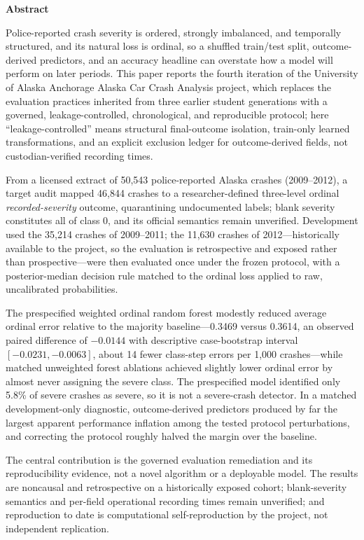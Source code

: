 \documentclass[11pt,letterpaper]{article}
\newcommand{\frontheading}[1]{%
  \begin{center}\bfseries #1\end{center}\vspace{8pt}%
}
\newcommand{\projectname}{Alaska Car Crash Analysis}
\begin{document}
\clearpage
\frontheading{Abstract}
Police-reported crash severity is ordered, strongly imbalanced, and temporally structured, and its natural loss is ordinal, so a shuffled train/test split, outcome-derived predictors, and an accuracy headline can overstate how a model will perform on later periods. This paper reports the fourth iteration of the University of Alaska Anchorage \projectname{} project, which replaces the evaluation practices inherited from three earlier student generations with a governed, leakage-controlled, chronological, and reproducible protocol; here ``leakage-controlled'' means structural final-outcome isolation, train-only learned transformations, and an explicit exclusion ledger for outcome-derived fields, not custodian-verified recording times.

From a licensed extract of 50,543 police-reported Alaska crashes (2009--2012), a target audit mapped 46,844 crashes to a researcher-defined three-level ordinal \emph{recorded-severity} outcome, quarantining undocumented labels; blank severity constitutes all of class 0, and its official semantics remain unverified. Development used the 35,214 crashes of 2009--2011; the 11,630 crashes of 2012---historically available to the project, so the evaluation is retrospective and exposed rather than prospective---were then evaluated once under the frozen protocol, with a posterior-median decision rule matched to the ordinal loss applied to raw, uncalibrated probabilities.

The prespecified weighted ordinal random forest modestly reduced average ordinal error relative to the majority baseline---0.3469 versus 0.3614, an observed paired difference of $-0.0144$ with descriptive case-bootstrap interval $[-0.0231,-0.0063]$, about 14 fewer class-step errors per 1,000 crashes---while matched unweighted forest ablations achieved slightly lower ordinal error by almost never assigning the severe class. The prespecified model identified only 5.8\% of severe crashes as severe, so it is not a severe-crash detector. In a matched development-only diagnostic, outcome-derived predictors produced by far the largest apparent performance inflation among the tested protocol perturbations, and correcting the protocol roughly halved the margin over the baseline.

The central contribution is the governed evaluation remediation and its reproducibility evidence, not a novel algorithm or a deployable model. The results are noncausal and retrospective on a historically exposed cohort; blank-severity semantics and per-field operational recording times remain unverified; and reproduction to date is computational self-reproduction by the project, not independent replication.
\end{document}

